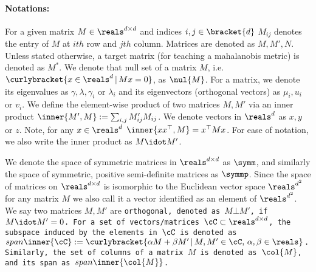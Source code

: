 \paragraph{Notations:} For a given matrix $M \in \reals^{d\times d}$ and indices $i,j \in \bracket{d}$ $M_{ij}$ denotes the entry of $M$ at $ith$ row and $jth$ column. Matrices are denoted as $M,M',N$. Unless stated otherwise, a target matrix (for teaching a mahalanobis metric) is denoted as $M^*$. We denote that null set of a matrix $M$, i.e. $\curlybracket{x \in \reals^d\,|\, Mx = 0}$, as $\nul{M}$.
For a matrix, we denote its eigenvalues as $\gamma,\lambda, \gamma_i$ or $\lambda_i$ and its eigenvectors (orthogonal vectors) as $\mu_i ,u_i$ or $v_i$. We define the element-wise product of two matrices $M,M'$ via an inner product $\inner{M', M} := \sum_{i,j} M'_{ij}M_{ij}$. 
We denote vectors in $\reals^d$ as $x,y$ or $z$.
Note, for any $x \in \reals^d$ $\inner{xx^{\top}, M} = x^{\top}Mx$. For ease of notation, we also write the inner product as $M \idot M'$.

We denote the space of symmetric matrices in $\reals^{d \times d}$ as $\symm$, and similarly the space of symmetric, positive semi-definite matrices as $\symmp$.
Since the space of matrices on $\reals^{d\times d}$ is isomorphic to the Euclidean vector space $\reals^{d^2}$ for any matrix $M$ we also call it a vector identified as an element of $\reals^{d^2}$. We say two matrices $M,M'$ are \tt{orthogonal}, denoted as $M \bot M'$, if $M \idot M' = 0$. For a set of vectors/matrices $\cC \subset \reals^{d\times d}$, the subspace induced by the elements in $\cC$ is denoted as $span \inner{\cC} := \curlybracket{\alpha M + \beta M' \,|\, M,M' \in \cC,\, \alpha, \beta \in \reals}$. Similarly, the set of columns of a matrix $M$ is denoted as $\col{M}$, and its span as $span \inner{\col{M}}$.


